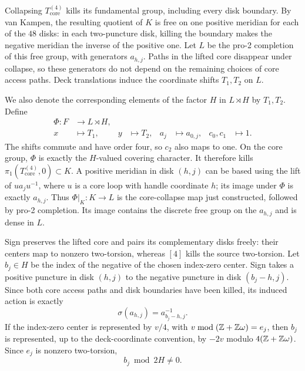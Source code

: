 Collapsing $T_{\mathrm{core}}^{(4)}$ kills its fundamental group, including every
disk boundary. By van Kampen, the resulting quotient of $K$ is
free on one positive meridian for each of the $48$ disks: in each
two-puncture disk, killing the boundary makes the negative meridian
the inverse of the positive one. Let $L$ be the pro-2 completion
of this free group, with generators $a_{h,j}$. Paths in the lifted
core disappear under collapse, so these generators do not depend
on the remaining choices of core access paths. Deck translations
induce the coordinate shifts $T_1,T_2$ on $L$.

We also denote the corresponding elements of the factor $H$ in
$L\rtimes H$ by $T_1,T_2$. Define
\begin{equation}\label{eq:torus-substitution}
 \begin{aligned}
 \Phi:F&\longrightarrow L\rtimes H,\\
 x&\longmapsto T_1,& y&\longmapsto T_2,&
 a_j&\longmapsto a_{0,j},& c_0,c_1&\longmapsto1.
 \end{aligned}
\end{equation}
The shifts commute and have order four, so $c_2$ also maps to one.
On the core group, $\Phi$ is exactly the $H$-valued covering
character. It therefore kills $\pi_1(T_{\mathrm{core}}^{(4)},0)\subset K$.
A positive meridian in disk $(h,j)$ can be based using the lift
of $u a_j u^{-1}$, where $u$ is a core loop with handle coordinate
$h$; its image under $\Phi$ is exactly $a_{h,j}$. Thus
$\Phi|_K:K\to L$ is the core-collapse map just constructed,
followed by pro-2 completion. Its image contains the discrete free
group on the $a_{h,j}$ and is dense in $L$.

Sign preserves the lifted core and pairs its complementary disks
freely: their centers map to nonzero two-torsion, whereas $[4]$
kills the source two-torsion. Let $b_j\in H$ be the index of the
negative of the chosen index-zero center. Sign takes a positive
puncture in disk $(h,j)$ to the negative puncture in disk
$(b_j-h,j)$. Since both core access paths and disk boundaries
have been killed, its induced action is exactly
\begin{equation}\label{eq:pinched-involution}
 \sigma(a_{h,j})=a_{b_j-h,j}^{-1}.
\end{equation}
If the index-zero center is represented by $v/4$, with
$v\bmod(\mathbb Z+\mathbb Z\omega)=e_j$, then $b_j$ is represented, up to
the deck-coordinate convention, by $-2v$ modulo
$4(\mathbb Z+\mathbb Z\omega)$. Since $e_j$ is nonzero two-torsion,
\begin{equation}\label{eq:odd-displacement}
 b_j\bmod2H\ne0.
\end{equation}

